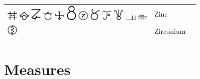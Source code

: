 \documentclass[british,final,landscape]{scrartcl}
\begin{document}
\begin{refsection}
\begin{supertabular}{p{0.3\textwidth}p{0.34\textwidth}p{0.34\textwidth}}
  \includegraphics[width=5mm]{Elements/Zinc1}  \includegraphics[width=5mm]{Elements/Zinc2}  \includegraphics[width=5mm]{Elements/Zinc3} \includegraphics[width=5mm]{Elements/Zinc4}  \includegraphics[width=5mm]{Elements/Zinc5}  \includegraphics[width=5mm]{Elements/Zinc6} \includegraphics[width=5mm]{Elements/Zinc7}  \includegraphics[width=5mm]{Elements/Zinc8}  \includegraphics[width=5mm]{Elements/Zinc9} \includegraphics[width=5mm]{Elements/Zinc10} \includegraphics[width=5mm]{Elements/Zinc11} \includegraphics[width=5mm]{Elements/Zinc12} & Zinc & \\
  \includegraphics[width=5mm]{Elements/Zirconium} & Zirconium & \\
\end{supertabular}

\section{Measures}


\end{refsection}
\end{document}
